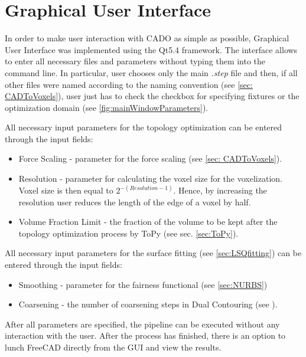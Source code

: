 \section{Graphical User Interface}
\label{sec:gui}
In order to make user interaction with CADO as simple as possible, Graphical User Interface was implemented using the Qt5.4 \cite{Qt} framework. 
The interface allows to enter all necessary files and parameters without typing them into the command line. In particular, user chooses only the main \textit{.step} file and then, if all other files were named according to the naming convention (see \autoref{sec: CADToVoxels}), user just has to check the checkbox for specifying fixtures or the optimization domain (see \autoref{fig:mainWindowParameters}).

All necessary input parameters for the topology optimization can be entered through the input fields:
\begin{itemize}
\item Force Scaling - parameter for the force scaling (see \autoref{sec: CADToVoxels}).
\item Resolution - parameter for calculating the voxel size for the voxelization. Voxel size is then equal to $2^{-(Resolution - 1)}$. Hence, by increasing the resolution user reduces the length of the edge of a voxel by half.
\item Volume Fraction Limit - the fraction of the volume to be kept after the topology optimization process by ToPy (see sec. \ref{sec:ToPy}).
\end{itemize}
All necessary input parameters for the surface fitting (see \autoref{sec:LSQfitting}) can be entered through the input fields:
\begin{itemize}
\item Smoothing - parameter for the fairness functional (see \autoref{sec:NURBS})
\item Coarsening - the number of coarsening steps in Dual Contouring (see ).
\end{itemize}

After all parameters are specified, the pipeline can  be executed without any interaction with the user. After the process has finished, there is an option to lunch FreeCAD directly from the GUI  and view the results.

